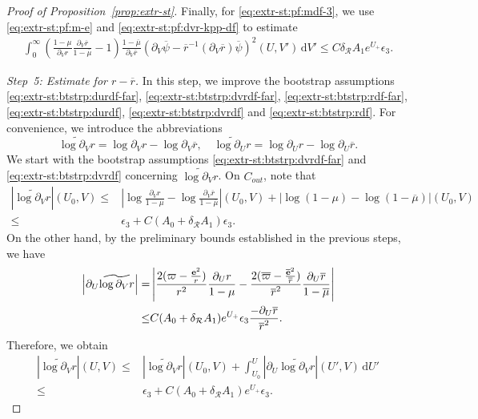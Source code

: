 \documentclass[10pt, reqno]{amsart}
\theoremstyle{definition}
\theoremstyle{remark}
\theoremstyle{conjecture}
\numberwithin{equation}{section}
\newcommand{\ud}{\mathrm{d}}
\newcommand{\rd}{\partial}
\newcommand{\0}{\emptyset}
\newcommand{\dlt}{\delta}
\newcommand{\eps}{\epsilon}
\newcommand{\bfe}{{\bf e}}
\newcommand{\calR}{\mathcal R}
\newcommand{\pfstep}[1]{\vspace{.5em} {\it \noindent #1.}}
\newcommand{\e}{\bfe}							%
\newcommand{\psibg}{\overline{\psi}}				%
\newcommand{\rbg}{\overline{r}}					%
\newcommand{\varpibg}{\overline{\varpi}}				%
\newcommand{\mubg}{\overline{\mu}}				%
\newcommand{\ebg}{\overline{\e}}					%
\newcommand{\Abs}[1]{\left\vert #1 \right\vert}
\begin{document}
\begin{proof}[Proof of Proposition~\ref{prop:extr-st}]
Finally, for \eqref{eq:extr-st:pf:mdf-3}, we use \eqref{eq:extr-st:pf:m-e} and \eqref{eq:extr-st:pf:dvr-kpp-df} to estimate
\begin{align*}
\int_{0}^{\infty} \left( \frac{1-\mu}{\rd_{V} r} \frac{\rd_{V} \rbg}{1-\mubg} - 1 \right) \frac{1-\mubg}{\rd_{V} \rbg} (\rd_{V} \psibg - \rbg^{-1} ( \rd_{V} \rbg ) \psibg)^{2} (U, V') \, \ud V' 
\leq C \dlt_{\calR} A_{1} e^{U_{+}} \eps_{3}.
\end{align*}

\pfstep{Step~5: Estimate for $r - \rbg$}
In this step, we improve the bootstrap assumptions \eqref{eq:extr-st:btstrp:durdf-far}, \eqref{eq:extr-st:btstrp:dvrdf-far}, \eqref{eq:extr-st:btstrp:rdf-far}, \eqref{eq:extr-st:btstrp:durdf}, \eqref{eq:extr-st:btstrp:dvrdf} and  \eqref{eq:extr-st:btstrp:rdf}. For convenience, we introduce the abbreviations 
\begin{equation*}
\widetilde{\log \rd_{V} r} = \log \rd_{V} r - \log \rd_{V} \rbg, \quad 
\widetilde{\log \rd_{U} r} = \log \rd_{U} r - \log \rd_{U} \rbg.
\end{equation*}
We start with the bootstrap assumptions \eqref{eq:extr-st:btstrp:dvrdf-far} and \eqref{eq:extr-st:btstrp:dvrdf} concerning $\widetilde{\log \rd_{V} r}$.
On $C_{out}$, note that
\begin{align*} 
	\Abs{\widetilde{\log \rd_{V} r}} (U_{0}, V)
\leq & \Abs{\log \frac{\rd_{V} r}{1-\mu} - \log \frac{\rd_{V} \rbg}{1-\mubg}} (U_{0}, V) + \Abs{\log (1-\mu) - \log (1-\mubg)} (U_{0}, V)  \\
\leq & \eps_{3} + C (A_{0} + \dlt_{\calR} A_{1}) \eps_{3}.
\end{align*}
On the other hand, by the preliminary bounds established in the previous steps, we have
\begin{align}
	\Abs{\rd_{U} \widetilde{\log \rd_{V} r}}
	= & \Abs{\frac{2 (\varpi - \frac{\e^{2}}{r})}{r^{2}} \frac{\rd_{U} r}{1-\mu}
	- \frac{2 (\varpibg - \frac{\ebg^{2}}{\rbg})}{\rbg^{2}} \frac{\rd_{U} \rbg}{1-\mubg}} \notag \\
	\leq & C (A_{0} + \dlt_{\calR} A_{1}) e^{U_{+}} \eps_{3} \frac{- \rd_{U} \rbg}{\rbg^{2}}. \label{eq:extr-st:pf:dulogdvrdf}
\end{align}
Therefore, we obtain
\begin{align*}
	\Abs{\widetilde{\log \rd_{V} r}} (U, V) 
	\leq & \Abs{\widetilde{\log \rd_{V} r}} (U_{0}, V) + \int_{U_{0}}^{U} \Abs{\rd_{U} \widetilde{\log \rd_{V} r}} (U', V) \, \ud U' \\
	\leq & \eps_{3} + C (A_{0} + \dlt_{\calR} A_{1}) e^{U_{+}} \eps_{3}.

\end{align*}
\end{proof}
\end{document}
